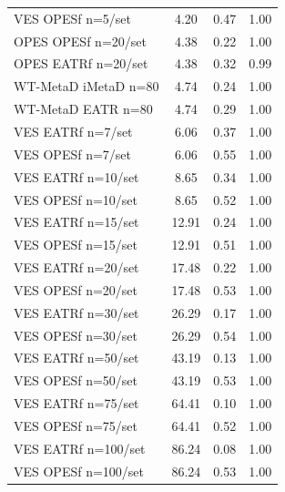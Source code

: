 \begin{longtable}{lccc}
VES OPESf n=5/set & 4.20 & 0.47 & 1.00 \\
OPES OPESf n=20/set & 4.38 & 0.22 & 1.00 \\
OPES EATRf n=20/set & 4.38 & 0.32 & 0.99 \\
WT-MetaD iMetaD n=80 & 4.74 & 0.24 & 1.00 \\
WT-MetaD EATR n=80 & 4.74 & 0.29 & 1.00 \\
VES EATRf n=7/set & 6.06 & 0.37 & 1.00 \\
VES OPESf n=7/set & 6.06 & 0.55 & 1.00 \\
VES EATRf n=10/set & 8.65 & 0.34 & 1.00 \\
VES OPESf n=10/set & 8.65 & 0.52 & 1.00 \\
VES EATRf n=15/set & 12.91 & 0.24 & 1.00 \\
VES OPESf n=15/set & 12.91 & 0.51 & 1.00 \\
VES EATRf n=20/set & 17.48 & 0.22 & 1.00 \\
VES OPESf n=20/set & 17.48 & 0.53 & 1.00 \\
VES EATRf n=30/set & 26.29 & 0.17 & 1.00 \\
VES OPESf n=30/set & 26.29 & 0.54 & 1.00 \\
VES EATRf n=50/set & 43.19 & 0.13 & 1.00 \\
VES OPESf n=50/set & 43.19 & 0.53 & 1.00 \\
VES EATRf n=75/set & 64.41 & 0.10 & 1.00 \\
VES OPESf n=75/set & 64.41 & 0.52 & 1.00 \\
VES EATRf n=100/set & 86.24 & 0.08 & 1.00 \\
VES OPESf n=100/set & 86.24 & 0.53 & 1.00\\ \bottomrule
\end{longtable}
